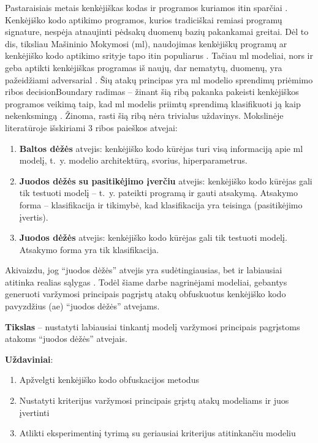 
Pastaraisiais metais kenkėjiškas kodas ir programos kuriamos itin sparčiai \numbers. Kenkėjiško kodo aptikimo programos, kurios tradiciškai remiasi programų \gls{signature}, nespėja atnaujinti pėdsakų duomenų bazių pakankamai greitai. Dėl to \acfp{di}, tiksliau Mašininio Mokymosi (\acs{ml}), naudojimas kenkėjiškų programų ar kenkėjiško kodo aptikimo srityje tapo itin populiarus \citeplace. Tačiau \ac{ml} modeliai, nors ir geba aptikti kenkėjiškas programas iš naujų, dar nematytų, duomenų, yra pažeidžiami \gls{adversarial} \citeplace. Šių atakų principas yra \ac{ml} modelio sprendimų priėmimo ribos \gls{decisionBoundary} radimas -- žinant šią ribą pakanka pakeisti kenkėjiškos programos veikimą taip, kad \ac{ml} modelis priimtų sprendimą klasifikuoti ją kaip nekenksmingą \citeplace. Žinoma, rasti šią ribą nėra trivialus uždavinys. Mokslinėje literatūroje išskiriami 3 ribos paieškos atvejai:
\begin{enumerate}
    \item \textbf{Baltos dėžės} atvejis: kenkėjiško kodo kūrėjas turi visą informaciją apie \ac{ml} modelį, t.~y. modelio architektūrą, svorius, hiperparametrus.
    \item \textbf{Juodos dėžės su pasitikėjimo įverčiu} atvejis: kenkėjiško kodo kūrėjas gali tik testuoti modelį -- t.~y. pateikti programą ir gauti atsakymą. Atsakymo forma -- klasifikacija ir tikimybė, kad klasifikacija yra teisinga (pasitikėjimo įvertis).
    \item \textbf{Juodos dėžės} atvejis: kenkėjiško kodo kūrėjas gali tik testuoti modelį. Atsakymo forma yra tik klasifikacija.
\end{enumerate}
Akivaizdu, jog \enquote{juodos dėžės} atvejis yra sudėtingiausias, bet ir labiausiai atitinka realias sąlygas \citeplace. Todėl šiame darbe nagrinėjami modeliai, gebantys generuoti varžymosi principais pagrįstų atakų obfuskuotus kenkėjiško kodo pavyzdžius (\acs{ae}) \enquote{juodos dėžės} atvejams.

\vspace{10pt}
\textbf{Tikslas} -- nustatyti labiausiai tinkantį modelį varžymosi principais pagrįstoms atakoms \enquote{juodos dėžės} atvejais.

\vspace{10pt}
\textbf{Uždaviniai}:
\begin{enumerate}
    \item Apžvelgti kenkėjiško kodo obfuskacijos metodus
    \item Nustatyti kriterijus varžymosi principais grįstų atakų modeliams ir juos įvertinti
    \item Atlikti eksperimentinį tyrimą su geriausiai kriterijus atitinkančiu modeliu
\end{enumerate}